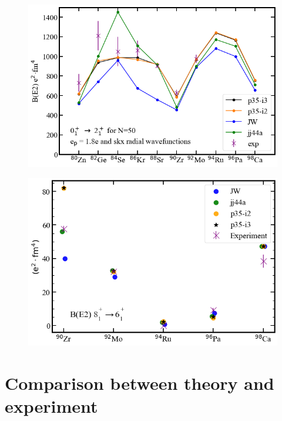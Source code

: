 \documentclass[aps,prl,twocolumn,tightenlines,superscriptaddress,showpacs]{revtex4-1}
\begin{document}
\begin{figure}
\includegraphics[scale=0.35]{be02.png}
\caption{
}
\label{ (13) }
\end{figure}

\begin{figure}
\includegraphics[scale=0.35]{be86.png}
\caption{
}
\label{ (14) }
\end{figure}














\section{Comparison between theory and experiment}
\end{document}

